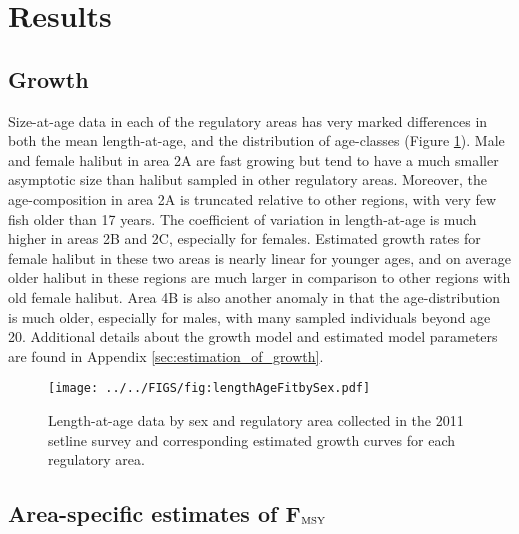 \section*{Results} %
\label{sec:results}

\subsection*{Growth} %
\label{sub:growth}

Size-at-age data in each of the regulatory areas has very marked differences in both the mean length-at-age, and the distribution of age-classes (Figure \ref{fig:FIGS_fig:lengthAgeFitbySex}). Male and female halibut in area 2A are fast growing but tend to have a much smaller asymptotic size than halibut sampled in other regulatory areas.  Moreover, the age-composition in area 2A is truncated relative to other regions, with very few fish older than 17 years.  The coefficient of variation in length-at-age is much higher in areas 2B and 2C, especially for females.  Estimated growth rates for female halibut in these two areas is nearly linear for younger ages, and on average older halibut in these regions are much larger in comparison to other regions with old female halibut.  Area 4B is also another anomaly in that the age-distribution is much older, especially for males, with many sampled individuals beyond age 20.  Additional details about the growth model and estimated model parameters are found in Appendix \ref{sec:estimation_of_growth}.

\begin{figure}[htbp]
	\centering
		\texttt{[image: ../../FIGS/fig:lengthAgeFitbySex.pdf]}
	\caption{Length-at-age data by sex and regulatory area collected in the 2011 setline survey and corresponding estimated growth curves for each regulatory area.}
	\label{fig:FIGS_fig:lengthAgeFitbySex}
\end{figure}

\subsection*{Area-specific estimates of F$_{\rm{MSY}}$} %
\label{sub:area_specific_estimates_of_FMSY}


